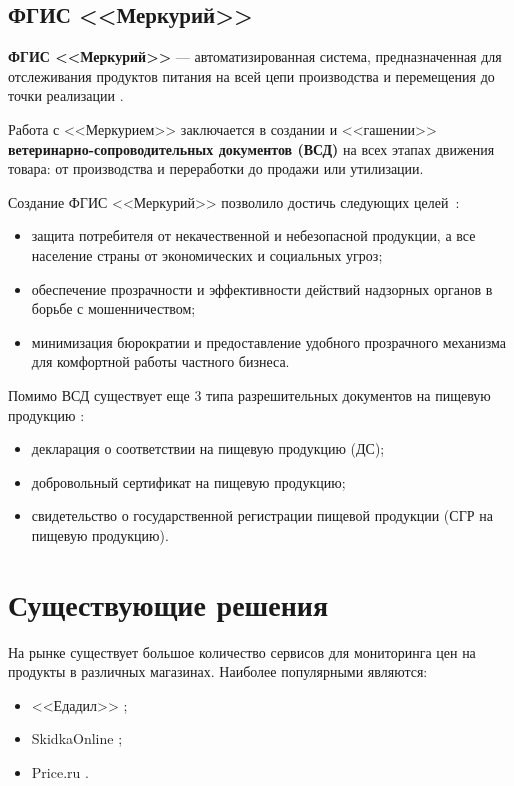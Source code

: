 \subsection{ФГИС <<Меркурий>>}

\textbf{ФГИС <<Меркурий>>} --- автоматизированная система, предназначенная для отслеживания продуктов питания на всей цепи производства и перемещения до точки реализации \cite{info_mercury}.

Работа с <<Меркурием>> заключается в создании и <<гашении>> \textbf{ветеринарно-сопроводительных документов (ВСД)} на всех этапах движения товара: от производства и переработки до продажи или утилизации.

Создание ФГИС <<Меркурий>> позволило достичь следующих целей~\cite{info_mercury, info_mercury2}:

\begin{itemize}[label=--]
	\item защита потребителя от некачественной и небезопасной продукции, а все население страны от экономических и социальных угроз;
	\item обеспечение прозрачности и эффективности действий надзорных органов в борьбе с мошенничеством;
	\item минимизация бюрократии и предоставление удобного прозрачного механизма для комфортной работы частного бизнеса.
\end{itemize}

Помимо ВСД существует еще 3 типа разрешительных документов на пищевую продукцию \cite{info_certificates}: 

\begin{itemize}[label*=--]
	\item декларация о соответствии на пищевую продукцию (ДС);
	\item добровольный сертификат на пищевую продукцию;
	\item свидетельство о государственной регистрации пищевой продукции (СГР на пищевую продукцию).
\end{itemize}

\clearpage

\section{Существующие решения}

На рынке существует большое количество сервисов для мониторинга цен на продукты в различных магазинах. Наиболее популярными являются:

\begin{itemize}[label=--]
	\item <<Едадил>> \cite{info_edadil};
	\item SkidkaOnline \cite{info_skidka_online};
	\item Price.ru \cite{info_price_ru}.
\end{itemize}

